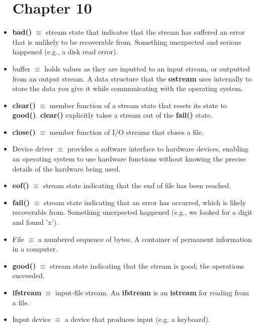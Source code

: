 \documentclass[12pt]{article}
\begin{document}
\begin{itemize}
\section*{Chapter 10}

\item \textbf{bad()} $\equiv$ stream state that indicates that the stream has suffered an error that is unlikely to be recoverable from. Something unexpected and serious happened (e.g., a disk read error).

\item buffer $\equiv$ holds values as they are inputted to an input stream, or outputted from an output stream. A data structure that the \textbf{ostream} uses internally to store the data you give it while communicating with the operating system.

\item \textbf{clear()} $\equiv$ member function of a stream state that resets its state to \textbf{good()}. \textbf{clear()} explicitly takes a stream out of the \textbf{fail()} state.

\item \textbf{close()} $\equiv$ member function of I/O streams that closes a file. 

\item Device driver $\equiv$ provides a software interface to hardware devices, enabling an operating system to use hardware functions without knowing the precise details of the hardware being used.

\item \textbf{eof()} $\equiv$ stream state indicating that the end of file has been reached.

\item \textbf{fail()} $\equiv$ stream state indicating that an error has occurred, which is likely recoverable from. Something unexpected happened (e.g., we looked for a digit and found 'x').

\item File $\equiv$ a numbered sequence of bytes. A container of permanent information in a computer.

\item \textbf{good()} $\equiv$ stream state indicating that the stream is good; the operations succeeded.

\item \textbf{ifstream} $\equiv$ input-file stream. An \textbf{ifstream} is an \textbf{istream} for reading from a file.

\item Input device $\equiv$ a device that produces input (e.g. a keyboard).


\end{itemize}
\end{document}
